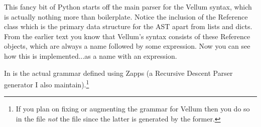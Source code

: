 This fancy bit of Python starts off the main parser for the Vellum syntax, which
is actually nothing more than boilerplate.  Notice the inclusion of the
Reference class which is the primary data structure for the AST apart from lists and
dicts.  From the earlier text you know that Vellum's syntax consists of these
Reference objects, which are always a name followed by some expression.  Now you
can see how this is implemented...as a name with an expression.

In  is the actual grammar defined using Zapps (a Recursive Descent Parser
generator I also maintain).\footnote{If you plan on fixing or augmenting the
    grammar for Vellum then you do so in the  file \emph{not} the
         file since the latter is generated by the former.}

